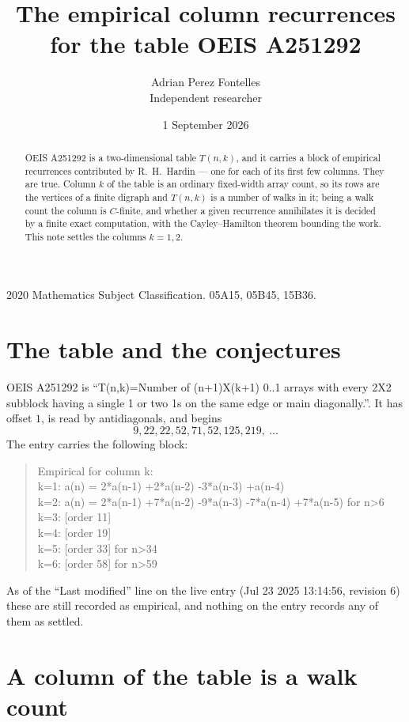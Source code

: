 \documentclass[11pt,a4paper]{article}
\title{The empirical column recurrences for the table OEIS A251292}
\author{Adrian Perez Fontelles\\ \small Independent researcher}
\date{1 September 2026}
\theoremstyle{plain}
\theoremstyle{definition}
\begin{document}
\maketitle

\begin{abstract}
OEIS A251292 is a two-dimensional table $T(n,k)$, and it carries a block of empirical
recurrences contributed by R.~H.~Hardin --- one for each of its first few columns. They are
true. Column $k$ of the table is an ordinary fixed-width array count, so its rows are the
vertices of a finite digraph and $T(n,k)$ is a number of walks in it; being a walk count the
column is $C$-finite, and whether a given recurrence annihilates it is decided by a finite
exact computation, with the Cayley--Hamilton theorem bounding the work. This note settles the columns $k=1, 2$.
\end{abstract}

\noindent\small 2020 Mathematics Subject Classification. 05A15, 05B45, 15B36.\normalsize

\section{The table and the conjectures}

OEIS A251292 is ``T(n,k)=Number of (n+1)X(k+1) 0..1 arrays with every 2X2 subblock having a single 1 or two 1s on the same edge or main diagonally.''. It has offset $1$, is
read by antidiagonals, and begins
\[
9, 22, 22, 52, 71, 52, 125, 219,\ \dots
\]
The entry carries the following block:
\begin{quote}\small
Empirical for column k:\\
k=1: a(n) = 2*a(n-1) +2*a(n-2) -3*a(n-3) +a(n-4)\\
k=2: a(n) = 2*a(n-1) +7*a(n-2) -9*a(n-3) -7*a(n-4) +7*a(n-5) for n>6\\
k=3: [order 11]\\
k=4: [order 19]\\
k=5: [order 33] for n>34\\
k=6: [order 58] for n>59\\
\end{quote}
As of the ``Last modified'' line on the live entry (Jul 23 2025 13:14:56, revision 6) these are still
recorded as empirical, and nothing on the entry records any of them as settled.

\section{A column of the table is a walk count}
\end{document}
